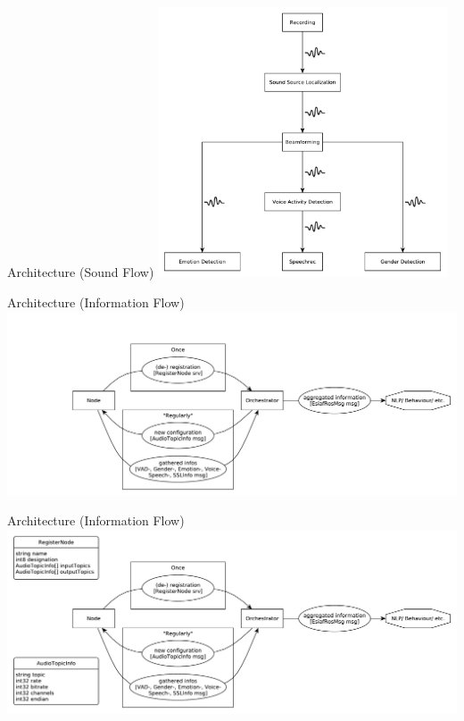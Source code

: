\documentclass{beamer}
\begin{document}
	\begin{frame}{Architecture (Sound Flow)}
		\centering
		\includegraphics[height=8cm]{Bilder/audio_flow_3}
	\end{frame}
	
	\begin{frame}{Architecture (Information Flow)}
		\centering
		\includegraphics[width=\textwidth]{Bilder/orchestrator_0}
	\end{frame}
	
	\begin{frame}{Architecture (Information Flow)}
		\centering
		\includegraphics[width=\textwidth]{Bilder/orchestrator_05}
	\end{frame}
	
\end{document}
